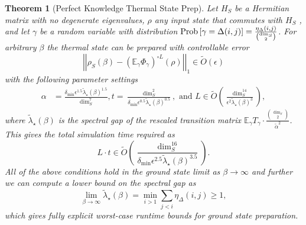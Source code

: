 \documentclass{article}
\newtheorem{theorem}{Theorem}
\newcommand{\norm}[1]{\left|\left| #1 \right|\right|}
\newcommand{\EE}{\mathbb{E}}
\newcommand{\prob}[1]{{\rm Prob}\left[ #1 \right]}
\newcommand{\bigotilde}[1]{\widetilde{O} \left( #1 \right)}
\begin{document}
\begin{theorem}[Perfect Knowledge Thermal State Prep] \label{thm:perfect_knowledge}
    Let $H_S$ be a Hermitian matrix with no degenerate eigenvalues, $\rho$ any input state that commutes with $H_S$ , and let $\gamma$ be a random variable with distribution $\prob{\gamma = \Delta(i,j)} = \frac{\eta_\Delta(i,j)}{\binom{\dim_S}{2}}$. For arbitrary $\beta$ the thermal state can be prepared with controllable error
    \begin{equation}
        \norm{\rho_S(\beta) - \left(\EE_\gamma \Phi_\gamma \right)^{\circ L}(\rho)}_1 \in \bigotilde{\epsilon}
    \end{equation}
     with the following parameter settings
     \begin{align}
         \alpha &= \frac{\delta_{\min} \epsilon^{1.5} \widetilde{\lambda}_\star(\beta)^{1.5}}{\dim_S^7}, t = \frac{\dim_S^2}{\delta_{\min} \epsilon^{0.5} \widetilde{\lambda}_\star(\beta)^{0.5}},\text{ and } L \in \bigotilde{\frac{\dim_S^{14}}{\epsilon^2 \widetilde{\lambda}_\star(\beta)^3}},
     \end{align}
     where $\widetilde{\lambda}_\star(\beta)$ is the spectral gap of the rescaled transition matrix $\EE_\gamma T_\gamma  \cdot \frac{\binom{\dim_S}{2}}{\widetilde{\alpha}^2}$. 
     This gives the total simulation time required as
     \begin{equation}
         L \cdot t \in \bigotilde{\frac{\dim_S^{16}}{\delta_{\min} \epsilon^{2.5} \widetilde{\lambda}_\star(\beta)^{3.5}}}.
     \end{equation}
     All of the above conditions hold in the ground state limit as $\beta \to \infty$ and further we can compute a lower bound on the spectral gap as
     \begin{equation}
         \lim_{\beta \to \infty} \widetilde{\lambda}_\star(\beta) = \min_{i > 1} \sum_{j < i} \eta_\Delta(i,j) \ge 1,
     \end{equation}
     which gives fully explicit worst-case runtime bounds for ground state preparation.
\end{theorem}
\end{document}
